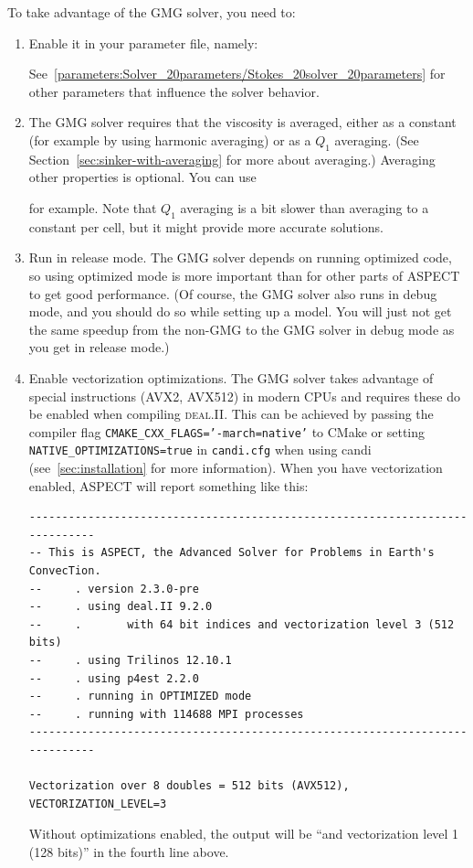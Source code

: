 \documentclass{article}
\newcommand{\dealii}{{\textsc{deal.II}}}
\begin{document}
To take advantage of the GMG solver, you need to:
\begin{enumerate}
 \item Enable it in your parameter file, namely:

  See~\ref{parameters:Solver_20parameters/Stokes_20solver_20parameters} for other
  parameters that influence the solver behavior.

\item
  The GMG solver requires that the viscosity is averaged, either as a constant (for example by using harmonic averaging)
  or as a $Q_1$ averaging. (See Section~\ref{sec:sinker-with-averaging}
  for more about averaging.) Averaging other properties is optional. You can
  use

for example. Note that $Q_1$ averaging is a bit slower than averaging to a constant per cell, but it
might provide more accurate solutions.

\item Run in release mode. The GMG solver depends on running optimized code, so using optimized mode
is more important than for other parts of ASPECT to get good
performance. (Of course, the GMG solver also runs in debug mode, and
you should do so while setting up a model. You will just not get the
same speedup from the non-GMG to the GMG solver in debug mode as you
get in release mode.)

\item Enable vectorization optimizations. The GMG solver takes advantage of special instructions (AVX2, AVX512)
in modern CPUs and requires these do be enabled when compiling \dealii{}. This can be achieved by passing the
compiler flag \texttt{CMAKE\_CXX\_FLAGS='-march=native'} to CMake or setting \texttt{NATIVE\_OPTIMIZATIONS=true} in \texttt{candi.cfg} when using candi (see~\ref{sec:installation} for more information).
When you have vectorization enabled, ASPECT will report something like
this:
\begin{lstlisting}[frame=single,language=ksh]
-----------------------------------------------------------------------------
-- This is ASPECT, the Advanced Solver for Problems in Earth's ConvecTion.
--     . version 2.3.0-pre
--     . using deal.II 9.2.0
--     .       with 64 bit indices and vectorization level 3 (512 bits)
--     . using Trilinos 12.10.1
--     . using p4est 2.2.0
--     . running in OPTIMIZED mode
--     . running with 114688 MPI processes
-----------------------------------------------------------------------------

Vectorization over 8 doubles = 512 bits (AVX512), VECTORIZATION_LEVEL=3
\end{lstlisting}
Without optimizations enabled, the output will be ``and vectorization
level 1 (128 bits)'' in the fourth line above.
\end{enumerate}
\end{document}
